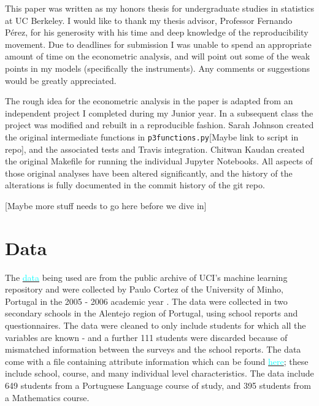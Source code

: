 \documentclass[12pt]{article}
\newcommand{\inlinecode}{\texttt}
\begin{document}
This paper was written as my honors thesis for undergraduate studies in statistics at UC Berkeley. I would like to thank my thesis advisor, Professor Fernando P\'erez, for his generosity with his time and deep knowledge of the reproducibility movement. Due to deadlines for submission I was unable to spend an appropriate amount of time on the econometric analysis, and will point out some of the weak points in my models (specifically the instruments). Any comments or suggestions would be greatly appreciated. 

The rough idea for the econometric analysis in the paper is adapted from an independent project I completed during my Junior year. In a subsequent class the project was modified and rebuilt in a reproducible fashion. Sarah Johnson created the original intermediate functions in \inlinecode{p3functions.py}\textcolor{BrickRed}{[Maybe link to script in repo]}, and the associated tests and Travis integration. Chitwan Kaudan created the original Makefile for running the individual Jupyter Notebooks. All aspects of those original analyses have been altered significantly, and the history of the alterations is fully documented in the commit history of the git repo.

\textcolor{BrickRed}{[Maybe more stuff needs to go here before we dive in]}


\newpage
\section{Data}
The \href{https://archive.ics.uci.edu/ml/datasets/Student+Performance#}{\textcolor{cyan}{data}} being used are from the public archive of UCI's machine learning repository and were collected by Paulo Cortez of the University of Minho, Portugal in the 2005 - 2006 academic year \citep{data_paper}. The data were collected in two secondary schools in the Alentejo region of Portugal, using school reports and questionnaires. The data were cleaned to only include students for which all the variables are known - and a further 111 students were discarded because of mismatched information between the surveys and the school reports. The data come with a file containing attribute information which can be found \href{https://archive.ics.uci.edu/ml/datasets/Student+Performance#}{\textcolor{cyan}{here}}; these include school, course, and many individual level characteristics. The data include 649 students from a Portuguese Language course of study, and 395 students from a Mathematics course. 
\end{document}
